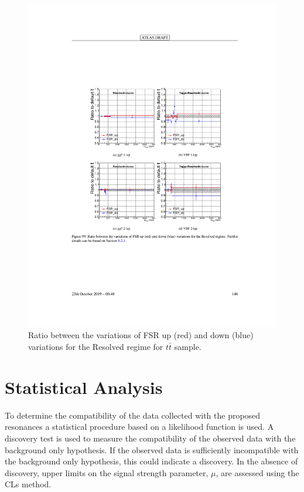 \begin{figure}[h!]
  \centering
  \includegraphics[width=\hsize]{figures/Analysis/modelingsysts/ttbar_fsr_res.pdf}
            \caption{Ratio between the variations of FSR up (red) and down (blue) variations for the Resolved regime for $t\bar{t}$ sample.} 
  \label{fig:ttbar_fsr_res}
\end{figure} 
\FloatBarrier

\chapter{Statistical Analysis}
To determine the compatibility of the data collected with the proposed resonances a statistical procedure based on a likelihood function is used. A discovery test is used to measure the compatibility of the observed data with the background only hypothesis. If the observed data is sufficiently incompatible with the background only hypothesis, this could indicate a discovery. In the absence of discovery, upper limits on the signal strength parameter, $\mu$, are assessed using the CLs method.

